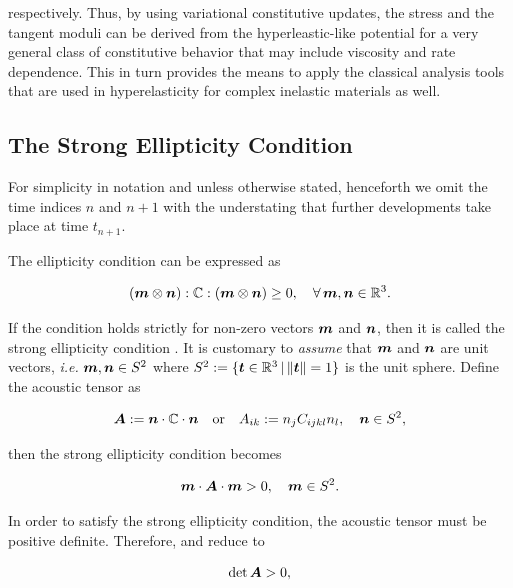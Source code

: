\documentclass[12pt]{article}
\numberwithin{equation}{section}
\begin{document}
respectively. Thus, by using variational constitutive updates, the
stress and the tangent moduli can be derived from the
hyperleastic-like potential 
for a very general class of constitutive behavior that may include
viscosity and rate dependence. This in turn provides the means to
apply the classical analysis tools that are used in hyperelasticity
for complex inelastic materials as well.

\subsection{The Strong Ellipticity Condition}

For simplicity in notation and unless otherwise stated, henceforth we
omit the time indices $n$ and $n+1$ with the understating that further
developments take place at time $t_{n+1}$.

The ellipticity condition can be expressed as

\begin{equation} \label{eq:strong-ellipticity}
  ({\boldsymbol{m}} \otimes {\boldsymbol{n}}) : \mathbb{C} : ({\boldsymbol{m}} \otimes {\boldsymbol{n}}) \ge 0,
  \quad
  \forall \, {\boldsymbol{m}}, {\boldsymbol{n}} \in \mathbb{R}^3.
\end{equation}

If the condition holds strictly for non-zero vectors ${\boldsymbol{m}}$ and ${\boldsymbol{n}}$,
then it is called the strong ellipticity condition
\citep{Hadamard:1903, Truesdell.Noll:2004,
  Miehe.etal:2004}. It is customary to \emph{assume} that
${\boldsymbol{m}}$ and ${\boldsymbol{n}}$ are unit vectors, \emph{i.e.} ${\boldsymbol{m}}, {\boldsymbol{n}} \in S^2$ where
$S^2 := \{ {\boldsymbol{t}} \in \mathbb{R}^3 \, | \, \| {\boldsymbol{t}} \| = 1\}$ is the unit
sphere. Define the acoustic tensor as

\begin{equation} \label{eq:acoustic-tensor}
  {\boldsymbol{A}} := {\boldsymbol{n}} \cdot \mathbb{C} \cdot {\boldsymbol{n}}
  \quad \text{or} \quad
  A_{ik} := n_j C_{ijkl} n_l,
  \quad
  {\boldsymbol{n}} \in S^2,
\end{equation}

then the strong ellipticity condition becomes

\begin{equation} \label{eq:acoustic-ellipticity}
  {\boldsymbol{m}} \cdot {\boldsymbol{A}} \cdot {\boldsymbol{m}} > 0, \quad {\boldsymbol{m}} \in S^2.
\end{equation}

In order to satisfy the strong ellipticity condition, the acoustic
tensor must be positive definite. Therefore,
 and 
reduce to

\begin{equation} \label{eq:acoustic-determinant}
  \det {\boldsymbol{A}} > 0,
\end{equation}
\end{document}
